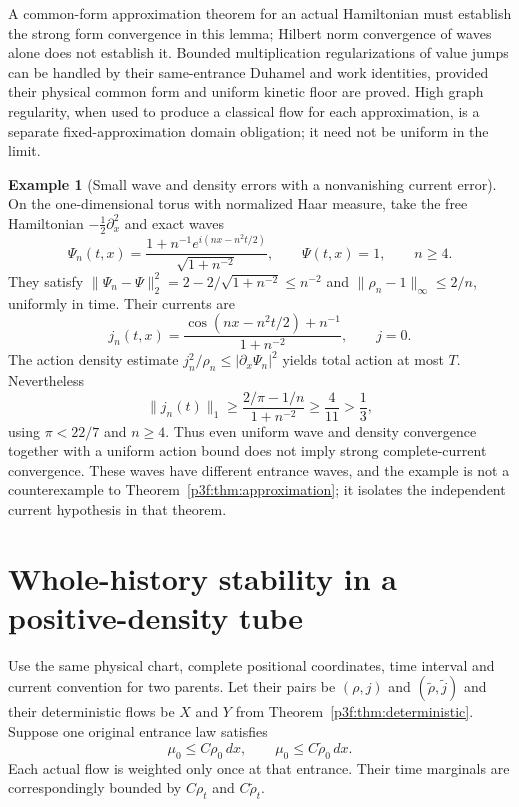 \documentclass[11pt]{article}
\numberwithin{equation}{section}
\theoremstyle{definition}
\newtheorem{example}[theorem]{Example}
\theoremstyle{remark}
\begin{document}
A common-form approximation theorem for an actual Hamiltonian must
establish the strong form convergence in this lemma; Hilbert norm
convergence of waves alone does not establish it. Bounded
multiplication regularizations of value jumps can be handled by
their same-entrance Duhamel and work identities, provided their
physical common form and uniform kinetic floor are proved.
High graph regularity, when used to produce a classical flow for
each approximation, is a separate fixed-approximation domain
obligation; it need not be uniform in the limit.

\begin{example}[Small wave and density errors with a nonvanishing current error]
\label{p3f:ex:highfrequency}
On the one-dimensional torus with normalized Haar measure, take the
free Hamiltonian $-\frac12\partial_x^2$ and exact waves
\[
 \Psi_n(t,x)=\frac{1+n^{-1}e^{i(nx-n^2t/2)}}{\sqrt{1+n^{-2}}},
 \qquad\Psi(t,x)=1,\qquad n\geq4 .
\]
They satisfy
$\|\Psi_n-\Psi\|_2^2=2-2/\sqrt{1+n^{-2}}\leq n^{-2}$
and $\|\rho_n-1\|_\infty\leq2/n$, uniformly in time. Their currents are
\[
 j_n(t,x)=\frac{\cos(nx-n^2t/2)+n^{-1}}{1+n^{-2}},
 \qquad j=0.
\]
The action density estimate
$j_n^2/\rho_n\leq|\partial_x\Psi_n|^2$ yields total action at most $T$.
Nevertheless
\[
 \|j_n(t)\|_1
 \geq\frac{2/\pi-1/n}{1+n^{-2}}
 \geq\frac{4}{11}>\frac13 ,
\]
using $\pi<22/7$ and $n\geq4$.
Thus even uniform wave and density convergence together with a uniform
action bound does not imply strong complete-current convergence.
These waves have different entrance waves, and the example is not a
counterexample to Theorem~\ref{p3f:thm:approximation}; it isolates the
independent current hypothesis in that theorem.
\end{example}

\section{Whole-history stability in a positive-density tube}
\label{p3f:sec:stability}

Use the same physical chart, complete positional coordinates, time
interval and current convention for two parents. Let their pairs be
$(\rho,j)$ and $(\widetilde\rho,\widetilde j)$ and their deterministic
flows be $X$ and $Y$ from Theorem~\ref{p3f:thm:deterministic}.
Suppose one original entrance law satisfies
\begin{equation}\label{p3f:eq:twocaps}
 \mu_0\leq C\rho_0\,dx,\qquad
 \mu_0\leq C\widetilde\rho_0\,dx.
\end{equation}
Each actual flow is weighted only once at that entrance.
Their time marginals are correspondingly bounded by $C\rho_t$
and $C\widetilde\rho_t$.
\end{document}
